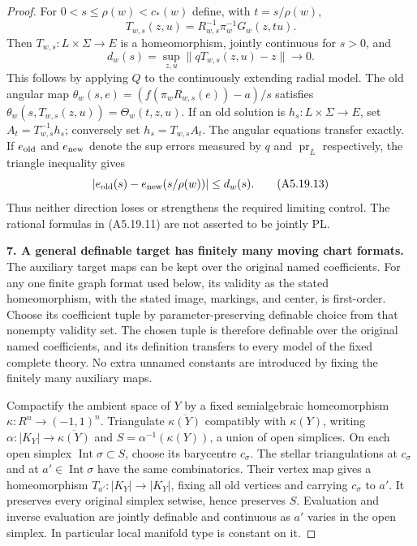 \begin{proof}
For $0<s\le\rho(w)<c_*(w)$ define, with $t=s/\rho(w)$,
\[
 T_{w,s}(z,u)=R_{w,s}^{-1}\pi_w^{-1}G_w(z,tu).
\]
Then $T_{w,s}:L\times\Sigma\to E$ is a homeomorphism, jointly continuous
for $s>0$, and
\[
 d_w(s)=\sup_{z,u}\|qT_{w,s}(z,u)-z\|\longrightarrow0.
 \tag{A5.19.12}
\]
This follows by applying $Q$ to the continuously extending radial model.
The old angular map
$\theta_w(s,e)=(f(\pi_wR_{w,s}(e))-a)/s$ satisfies
$\theta_w(s,T_{w,s}(z,u))=\Theta_w(t,z,u)$.
If an old solution is $h_s:L\times\Sigma\to E$, set
$A_t=T_{w,s}^{-1}h_s$; conversely set $h_s=T_{w,s}A_t$.
The angular equations transfer exactly. If $e_{\rm old}$ and
$e_{\rm new}$ denote the sup errors measured by $q$ and $\operatorname{pr}_L$
respectively, the triangle inequality gives
\[
 |e_{\rm old}(s)-e_{\rm new}(s/\rho(w))|\le d_w(s).
 \tag{A5.19.13}
\]
Thus neither direction loses or strengthens the required limiting control.
The rational formulas in (A5.19.11) are not asserted to be jointly PL.

\textbf{7. A general definable target has finitely many moving chart formats.}\quad
The auxiliary target maps can be kept over the original named coefficients.
For any one finite graph format used below, its validity as the stated
homeomorphism, with the stated image, markings, and center, is first-order.
Choose its coefficient tuple by parameter-preserving definable choice
from that nonempty validity set. The chosen tuple is therefore definable
over the original named coefficients, and its definition transfers to
every model of the fixed complete theory. No extra unnamed constants
are introduced by fixing the finitely many auxiliary maps.

Compactify the ambient space of $Y$ by a fixed semialgebraic homeomorphism
$\kappa:R^n\to(-1,1)^n$. Triangulate $\overline{\kappa(Y)}$ compatibly
with $\kappa(Y)$, writing
$\alpha:|K_Y|\to\overline{\kappa(Y)}$ and
$S=\alpha^{-1}(\kappa(Y))$, a union of open simplices. On each open
simplex $\operatorname{Int}\sigma\subset S$, choose its barycentre
$c_\sigma$. The stellar triangulations at $c_\sigma$ and at
$a'\in\operatorname{Int}\sigma$ have the same combinatorics. Their
vertex map gives a homeomorphism $T_{a'}:|K_Y|\to|K_Y|$, fixing all old
vertices and carrying $c_\sigma$ to $a'$. It preserves every original
simplex setwise, hence preserves $S$. Evaluation and inverse evaluation
are jointly definable and continuous as $a'$ varies in the open simplex.
In particular local manifold type is constant on it.


\end{proof}
